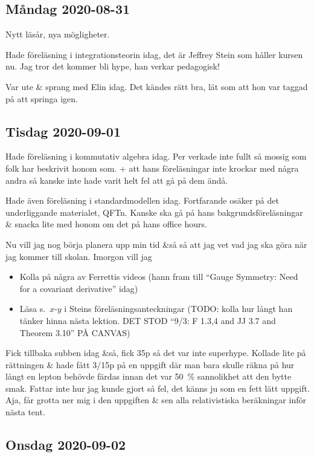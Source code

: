 \subsection{Måndag 2020-08-31}

Nytt läsår, nya mögligheter.

Hade föreläsning i integrationsteorin idag, det är Jeffrey Stein som håller kursen nu. Jag tror det kommer bli hype, han verkar pedagogisk!

Var ute \& sprang med Elin idag. Det kändes rätt bra, lät som att hon var taggad på att springa igen.


\subsection{Tisdag 2020-09-01}

Hade föreläsning i kommutativ algebra idag. Per verkade inte fullt så mossig som folk har beskrivit honom som. + att hans föreläsningar inte krockar med några andra så kanske inte hade varit helt fel att gå på dem ändå.

Hade även föreläsning i standardmodellen idag. Fortfarande osäker på det underliggande materialet, QFTn. Kanske ska gå på hans bakgrundsföreläsningar \& snacka lite med honom om det på hans office hours.

Nu vill jag nog börja planera upp min tid \&så så att jag vet vad jag ska göra när jag kommer till skolan. Imorgon vill jag
\begin{itemize}
    \item Kolla på några av Ferrettis videos (hann fram till \enquote{Gauge Symmetry: Need for a covariant derivative} idag)
    \item Läsa s.\ $x$-$y$ i Steins föreläsningsanteckningar (TODO: kolla hur långt han tänker hinna nästa lektion. DET STOD \enquote{9/3: F 1.3,4 and JJ 3.7 and Theorem 3.10} PÅ CANVAS)
\end{itemize}

Fick tillbaka subben idag \&så, fick 35p så det var inte superhype. Kollade lite på rättningen \& hade fått 3/15p på en uppgift där man bara skulle räkna på hur långt en lepton behövde färdas innan det var \SI{50}{\percent} sannolikhet att den bytte smak. Fattar inte hur jag kunde gjort så fel, det känns ju som en fett lätt uppgift. Aja, får grotta ner mig i den uppgiften \& sen alla relativistiska beräkningar inför nästa tent.


\subsection{Onsdag 2020-09-02}


